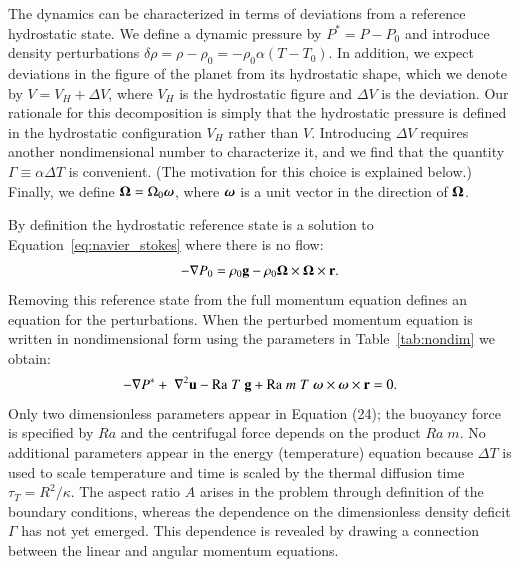 \documentclass[preprint,12pt,authoryear]{elsarticle}
\newcommand{\mitbf}[1]{\hbox{\mathversion{bold}$#1$}}
\begin{document}
The dynamics can be characterized in terms of deviations from a reference hydrostatic state. We define a
 dynamic pressure by $P^* = P - P_0$ and introduce density perturbations $\delta \rho = \rho- \rho_0 = - \rho_0 \alpha (T-T_0)$.
In addition, we expect deviations in the figure of the planet from its hydrostatic shape, 
which we denote by $V = V_H + \Delta V$, where $V_H$ is the hydrostatic figure and $\Delta V$ is the deviation. 
Our rationale for this decomposition is simply that the hydrostatic pressure is defined in the hydrostatic configuration $V_H$ rather than $V$. 
Introducing $\Delta V$ requires another nondimensional number to characterize it, 
and we find that the quantity $\Gamma \equiv \alpha \Delta T$ is convenient. (The motivation for this choice is explained below.)
Finally, we define $\mitbf{\Omega} = \Omega_0 \mitbf{\omega}$, where $\mitbf{\omega}$ is a unit vector in the direction of $\mitbf{\Omega}$.

By definition the hydrostatic reference state is a solution to Equation~\eqref{eq:navier_stokes} where there is no flow:
\begin{equation}
\begin{aligned}
- \nabla P_0 =  \rho_0 \mathbf{g} -  \rho_0 \mitbf{\Omega} \times \mitbf{\Omega} \times \mathbf{r}.
\label{eq:hydrostatic}
\end{aligned}
\end{equation}
Removing this reference state from the full momentum equation defines an equation for the perturbations. 
When the perturbed momentum equation is written in nondimensional form using the parameters in Table~\ref{tab:nondim} we obtain:
\begin{equation}
\begin{aligned}
 - \nabla P^* + \; \nabla^2 \mathbf{u} - \mathrm{Ra} \; T \; \mathbf{g} + \mathrm{Ra} \; m \; T \;{\mitbf{\omega} \times \mitbf{\omega} \times \mathbf{r}} = 0.
\end{aligned}
\end{equation}
Only two dimensionless parameters appear in Equation (24); the buoyancy force is specified by $Ra$ and the centrifugal force depends on the product $Ra\; m$.
No additional parameters appear in the energy (temperature) equation because $\Delta T$ is used to scale temperature and time is scaled by the thermal diffusion time $\tau_T = R^2/\kappa$.
The aspect ratio $A$ arises in the problem through definition of the boundary conditions, whereas the dependence on the dimensionless density deficit $\Gamma$ has not yet emerged. This dependence is
revealed by drawing a connection between the linear and angular momentum equations. 
\end{document}
